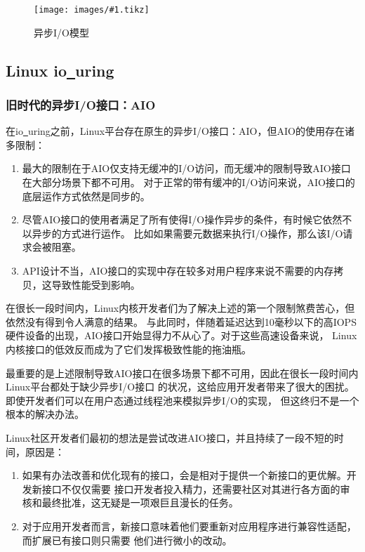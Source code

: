 \documentclass[supercite]{HustGraduPaper}
\newcommand{\cfig}[3]{
  \begin{figure}[htb]
    \centering
    \texttt{[image: images/\#1.tikz]}
    \caption{#3}
    \label{fig:#1}
  \end{figure}
}
\theoremstyle{definition}
\begin{document}
\cfig{async-io}{0.7}{异步I/O模型}

\subsection{Linux io\underline{~}uring}

\subsubsection{旧时代的异步I/O接口：AIO}
在io\underline{~}uring之前，Linux平台存在原生的异步I/O接口：AIO，但AIO的使用存在诸多限制：

\begin{enumerate}
  \item 最大的限制在于AIO仅支持无缓冲的I/O访问，而无缓冲的限制导致AIO接口在大部分场景下都不可用。
    对于正常的带有缓冲的I/O访问来说，AIO接口的底层运作方式依然是同步的。
  \item 尽管AIO接口的使用者满足了所有使得I/O操作异步的条件，有时候它依然不以异步的方式进行运作。
    比如如果需要元数据来执行I/O操作，那么该I/O请求会被阻塞。
  \item API设计不当，AIO接口的实现中存在较多对用户程序来说不需要的内存拷贝，这导致性能受到影响。
\end{enumerate}

在很长一段时间内，Linux内核开发者们为了解决上述的第一个限制煞费苦心，但依然没有得到令人满意的结果。
与此同时，伴随着延迟达到10毫秒以下的高IOPS硬件设备的出现，AIO接口开始显得力不从心了。对于这些高速设备来说，
Linux内核接口的低效反而成为了它们发挥极致性能的拖油瓶。\par

最重要的是上述限制导致AIO接口在很多场景下都不可用，因此在很长一段时间内Linux平台都处于缺少异步I/O接口
的状况，这给应用开发者带来了很大的困扰。即使开发者们可以在用户态通过线程池来模拟异步I/O的实现，
但这终归不是一个根本的解决办法。\par

Linux社区开发者们最初的想法是尝试改进AIO接口，并且持续了一段不短的时间，原因是：

\begin{enumerate}
  \item 如果有办法改善和优化现有的接口，会是相对于提供一个新接口的更优解。开发新接口不仅仅需要
    接口开发者投入精力，还需要社区对其进行各方面的审核和最终批准，这无疑是一项艰巨且漫长的任务。
  \item 对于应用开发者而言，新接口意味着他们要重新对应用程序进行兼容性适配，而扩展已有接口则只需要
    他们进行微小的改动。
\end{enumerate}
\end{document}
